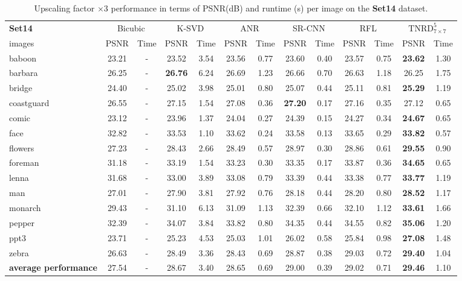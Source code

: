 \documentclass[10pt,journal,compsoc]{IEEEtran}
\begin{document}
\begin{table*}[t!]
\centering
\begin{tabular}{|l| c| c| c| c| c| c| c| c| c| c|c| c|}
\hline
\textbf{Set14} & \multicolumn{2}{c|}{Bicubic}& \multicolumn{2}{c|}{K-SVD \cite{SRKSVD}}& \multicolumn{2}{c|}{ANR \cite{ANR}}
& \multicolumn{2}{c|}{SR-CNN \cite{SRCNN}} & \multicolumn{2}{c|}{RFL \cite{schulter15}} 
& \multicolumn{2}{c|}{$\text{TNRD}_{7 \times 7}^5$} \\
\cline{2-13}
images& PSNR & Time& PSNR & Time& PSNR & Time& PSNR & Time& PSNR & Time& PSNR & Time\\
\hline\hline
baboon & 23.21 & - &23.52 & 3.54 & 23.56 & 0.77 & 23.60 & 0.40 & 23.57 & 0.75 & \textbf{23.62} & 1.30\\
barbara & 26.25 & - &\textbf{26.76} & 6.24 & 26.69 & 1.23 & 26.66 & 0.70 & 26.63 & 1.18 & 26.25 & 1.75 \\
bridge & 24.40 & - & 25.02 & 3.98 & 25.01 & 0.80 & 25.07 & 0.44 & 25.11 & 0.81 & \textbf{25.29} & 1.19\\
coastguard & 26.55 & - & 27.15 & 1.54 &27.08 & 0.36 & \textbf{27.20} & 0.17 & 27.16 & 0.35 & 27.12 & 0.65\\
comic & 23.12 & - & 23.96 & 1.37 & 24.04 & 0.27 & 24.39 & 0.15 & 24.27 & 0.34 & \textbf{24.67} & 0.65\\
face & 32.82 & - & 33.53 & 1.10 & 33.62 & 0.24 & 33.58 & 0.13 & 33.65 & 0.29 & \textbf{33.82} & 0.57\\
flowers & 27.23 & - & 28.43 & 2.66 &28.49 & 0.57 & 28.97 & 0.30 & 28.86 & 0.61 & \textbf{29.55} & 0.90\\
foreman & 31.18 & - & 33.19 & 1.54 & 33.23 & 0.30 & 33.35 & 0.17 & 33.87 & 0.36 & \textbf{34.65} & 0.65\\
lenna & 31.68 & - & 33.00 & 3.89 & 33.08 & 0.79 & 33.39 & 0.44 & 33.38 & 0.77 & \textbf{33.77 } & 1.19 \\
man & 27.01 & - & 27.90 & 3.81 & 27.92 & 0.76 & 28.18 & 0.44 & 28.20 & 0.80 & \textbf{28.52} & 1.17\\
monarch & 29.43 & - & 31.10 & 6.13 &31.09 & 1.13 & 32.39 & 0.66 & 32.10 & 1.12 & \textbf{33.61} & 1.66\\
pepper & 32.39 & - & 34.07 & 3.84 & 33.82 & 0.80 & 34.35 & 0.44 & 34.55 & 0.82 & \textbf{35.06} & 1.20\\
ppt3 & 23.71 & - & 25.23 & 4.53 & 25.03 & 1.01 & 26.02 & 0.58 & 25.84 & 0.98 & \textbf{27.08} & 1.48\\
zebra & 26.63 & - & 28.49 & 3.36 & 28.43 & 0.69 & 28.87 & 0.38 & 29.03 & 0.72 & \textbf{29.40} & 1.04\\
\hline\hline
\rowcolor[gray]{0.85} \textbf{average performance} 
& 27.54 & - & 28.67 & 3.40 & 28.65 & 0.69 & 29.00 & 0.39 & 29.02 & 0.71 & \textbf{29.46} & 1.10\\
\hline
\end{tabular}\vspace*{0.2cm}
\caption{Upscaling factor $\times 3$ performance in terms of PSNR(dB) and runtime (s) per image on the 
\textbf{Set14} dataset.}\label{table:set14}
\vspace*{-0.75cm}
\end{table*}
\end{document}
